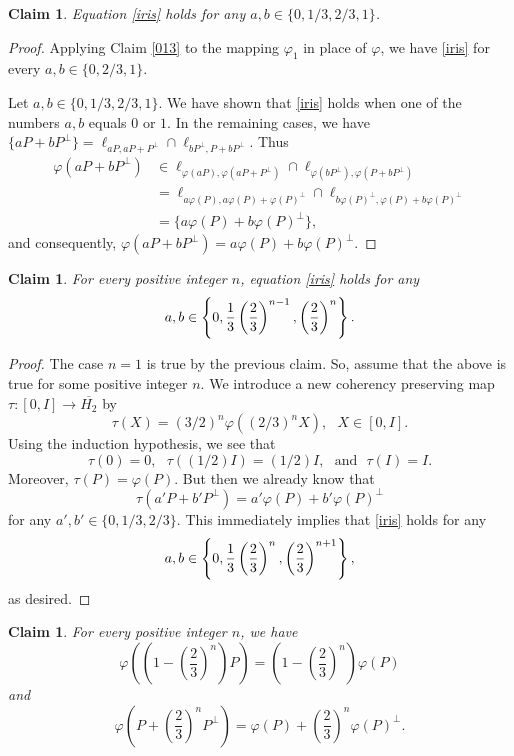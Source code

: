 \documentclass[10pt,a4paper]{amsart}
\newcommand\oH{{\overline{H_2}}}
\newtheorem{claim}[theorem]{Claim}
\theoremstyle{definition}
\theoremstyle{remark}
\numberwithin{subsection}{section}
\numberwithin{equation}{section}
\begin{document}
\begin{claim}\label{0123}
Equation \eqref{iris} holds for any $a, b\in \{0, 1/3, 2/3, 1\}$. 
\end{claim}
\begin{proof}
Applying Claim \ref{013} to the mapping $\varphi_1$ in place of $\varphi$, we have \eqref{iris} for every $a, b\in \{0, 2/3, 1\}$.

Let $a,b \in \{ 0, 1/3, 2/3, 1\}$. 
We have shown that \eqref{iris} holds when one of the numbers $a,b$ equals $0$ or $1$. 
In the remaining cases, we have $\{aP + bP^\perp\}=\ell_{aP, aP+P^\perp}\cap \ell_{bP^{\perp}, P+bP^\perp}$. Thus 
\[
\begin{split}
\varphi(aP + bP^\perp)&\in\ell_{\varphi(aP), \varphi(aP+P^\perp)}\cap \ell_{\varphi(bP^{\perp}), \varphi(P+bP^\perp)}\\
&=\ell_{a\varphi(P), a\varphi(P)+\varphi(P)^\perp}\cap \ell_{b\varphi(P)^{\perp}, \varphi(P)+b\varphi(P)^\perp}\\
&= \{a\varphi(P) + b\varphi(P)^\perp\},
\end{split}
\]
and consequently, $\varphi(aP + bP^\perp)=a\varphi(P) + b\varphi(P)^\perp$.
\end{proof}


\begin{claim}
For every positive integer $n$, equation \eqref{iris} holds for any 
\[
a,b \in \left\{ 0, {1 \over 3}  \left({2 \over 3}\right)^{n-1}, \left({2 \over 3}\right)^{n} \right\}.
\]
\end{claim}

\begin{proof}
The case $n=1$ is true by the previous claim. So, assume that the above is true for some positive integer $n$. 
We introduce a new coherency preserving map $\tau \colon [0, I ] \to \oH$ by
\[
\tau (X) = \left (3/2 \right)^n \varphi \left(\left(2/3\right)^n X \right), \ \ \ X \in [0,I].
\]
Using the induction hypothesis, we see that
\[
\tau (0) = 0, \ \ \ \tau ((1/2)I) = (1/2)I, \ \ \ \text{and} \ \ \ \tau (I) = I.
\]
Moreover, $\tau (P) = \varphi (P)$.
But then we already know that
\[
\tau (a' P + b' P^\perp ) = a' \varphi (P) + b' \varphi (P)^\perp
\]
for any $a',b' \in \{ 0, 1/3 , 2/3 \}$. This immediately implies that \eqref{iris} holds for any 
\[
a,b \in \left\{ 0, {1 \over 3}  \left({2 \over 3}\right)^{n}, \left({2 \over 3}\right)^{n+1} \right\},
\]
as desired.
\end{proof}

\begin{claim}
For every positive integer $n$, we have
\begin{equation}\label{sita}
\varphi \left( \left(1-\left(\frac{2}{3}\right)^n \right) P \right) = \left(1-\left(\frac{2}{3}\right)^n\right) \varphi ( P )
\end{equation}
and
\begin{equation}\label{ue}
\varphi \left( P +\left(\frac{2}{3}\right)^n  P^\perp \right) = \varphi (P) + \left(\frac{2}{3}\right)^n \varphi (P)^\perp.
\end{equation}
\end{claim}
\end{document}
